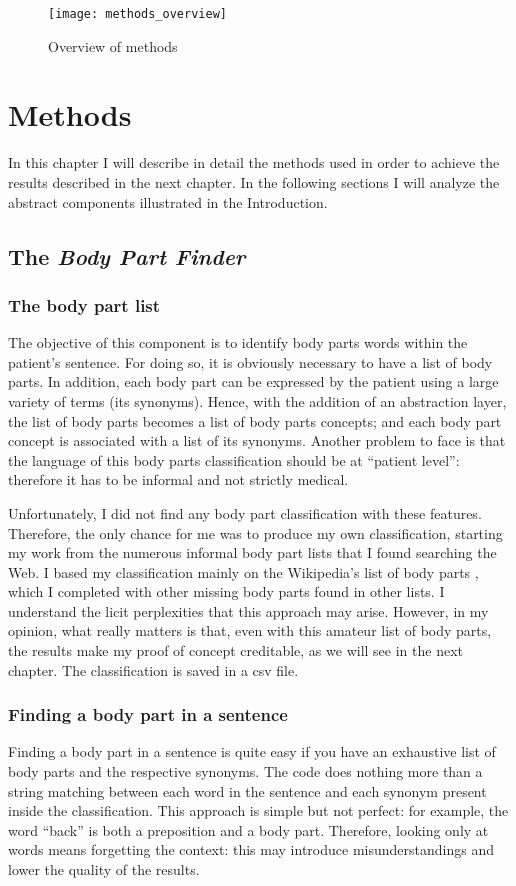 \begin{figure}[h]
\centering
\texttt{[image: methods\_overview]}
\caption{Overview of methods}
\medskip
\end{figure}

\newpage
\chapter{Methods}
\label{cha:methods}
In this chapter I will describe in detail the methods used in order to achieve the results described in the next chapter. In the following sections I will analyze the abstract components illustrated in the Introduction.

\section{The \textit{Body Part Finder}}
\label{sec:body_part_finder}
\subsection{The body part list}
The objective of this component is to identify body parts words within the patient's sentence. For doing so, it is obviously necessary to have a list of body parts. In addition, each body part can be expressed by the patient using a large variety of terms (its synonyms). Hence, with the addition of an abstraction layer, the list of body parts becomes a list of body parts concepts; and each body part concept is associated with a list of its synonyms. Another problem to face is that the language of this body parts classification should be at “patient level”: therefore it has to be informal and not strictly medical.

Unfortunately, I did not find any body part classification with these features. Therefore, the only chance for me was to produce my own classification, starting my work from the numerous informal body part lists that I found searching the Web. I based my classification mainly on the Wikipedia's list of body parts \cite{bodypartswiki}, which I completed with other missing body parts found in other lists. I understand the licit perplexities that this approach may arise. However, in my opinion, what really matters is that, even with this amateur list of body parts, the results make my proof of concept creditable, as we will see in the next chapter. The classification is saved in a csv file.

\subsection{Finding a body part in a sentence}
Finding a body part in a sentence is quite easy if you have an exhaustive list of body parts and the respective synonyms. The code does nothing more than a string matching between each word in the sentence and each synonym present inside the classification. This approach is simple but not perfect: for example, the word “back” is both a preposition and a body part. Therefore, looking only at words means forgetting the context: this may introduce misunderstandings and lower the quality of the results.

